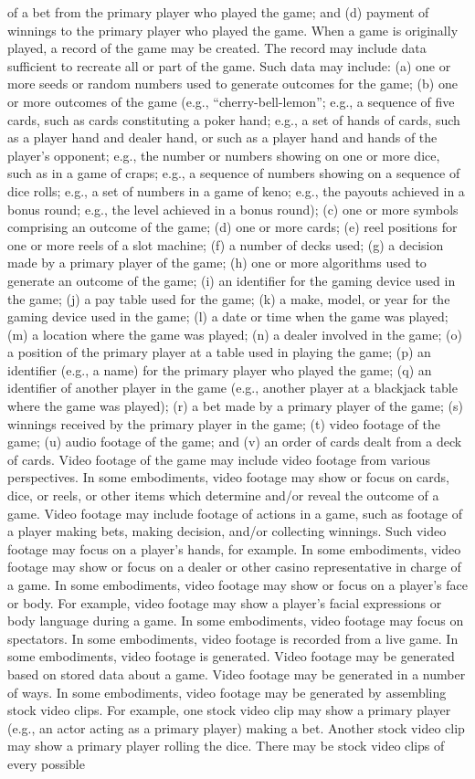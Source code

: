 \documentclass[11pt,a4paper]{article}
\begin{document}
of a bet from the primary player who played the game; and (d) payment of winnings to the primary player who played the game. When a game is originally played, a record of the game may be created. The record may include data sufficient to recreate all or part of the game. Such data may include: (a) one or more seeds or random numbers used to generate outcomes for the game; (b) one or more outcomes of the game (e.g., “cherry-bell-lemon”; e.g., a sequence of five cards, such as cards constituting a poker hand; e.g., a set of hands of cards, such as a player hand and dealer hand, or such as a player hand and hands of the player's opponent; e.g., the number or numbers showing on one or more dice, such as in a game of craps; e.g., a sequence of numbers showing on a sequence of dice rolls; e.g., a set of numbers in a game of keno; e.g., the payouts achieved in a bonus round; e.g., the level achieved in a bonus round); (c) one or more symbols comprising an outcome of the game; (d) one or more cards; (e) reel positions for one or more reels of a slot machine; (f) a number of decks used; (g) a decision made by a primary player of the game; (h) one or more algorithms used to generate an outcome of the game; (i) an identifier for the gaming device used in the game; (j) a pay table used for the game; (k) a make, model, or year for the gaming device used in the game; (l) a date or time when the game was played; (m) a location where the game was played; (n) a dealer involved in the game; (o) a position of the primary player at a table used in playing the game; (p) an identifier (e.g., a name) for the primary player who played the game; (q) an identifier of another player in the game (e.g., another player at a blackjack table where the game was played); (r) a bet made by a primary player of the game; (s) winnings received by the primary player in the game; (t) video footage of the game; (u) audio footage of the game; and (v) an order of cards dealt from a deck of cards. Video footage of the game may include video footage from various perspectives. In some embodiments, video footage may show or focus on cards, dice, or reels, or other items which determine and/or reveal the outcome of a game. Video footage may include footage of actions in a game, such as footage of a player making bets, making decision, and/or collecting winnings. Such video footage may focus on a player's hands, for example. In some embodiments, video footage may show or focus on a dealer or other casino representative in charge of a game. In some embodiments, video footage may show or focus on a player's face or body. For example, video footage may show a player's facial expressions or body language during a game. In some embodiments, video footage may focus on spectators. In some embodiments, video footage is recorded from a live game. In some embodiments, video footage is generated. Video footage may be generated based on stored data about a game. Video footage may be generated in a number of ways. In some embodiments, video footage may be generated by assembling stock video clips. For example, one stock video clip may show a primary player (e.g., an actor acting as a primary player) making a bet. Another stock video clip may show a primary player rolling the dice. There may be stock video clips of every possible 
\end{document}
